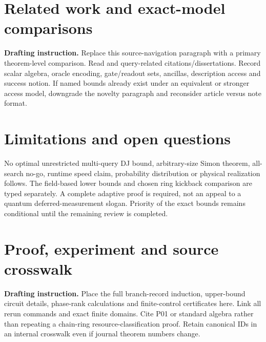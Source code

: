\documentclass[11pt]{article}
\newcommand{\buildnote}[1]{\par\smallskip\noindent\textbf{Drafting instruction.} #1\par\smallskip}
\begin{document}
\section{Related work and exact-model comparisons}
\buildnote{Replace this source-navigation paragraph with a primary theorem-level
comparison. Read \cite{Schumacher2010,Schumacher2012,deBeaudrap2014,James2011,Hanson2011}
and query-related citations/dissertations. Record scalar algebra, oracle
encoding, gate/readout sets, ancillas, description access and success notion.
If named bounds already exist under an equivalent or stronger access model,
downgrade the novelty paragraph and reconsider article versus note format.}

\section{Limitations and open questions}
No optimal unrestricted multi-query DJ bound, arbitrary-size Simon theorem,
all-search no-go, runtime speed claim, probability distribution or physical
realization follows. The field-based lower bounds and chosen ring kickback
comparison are typed separately. A complete adaptive proof is required, not an
appeal to a quantum deferred-measurement slogan. Priority of the exact bounds
remains conditional until the remaining review is completed.

\appendix
\section{Proof, experiment and source crosswalk}
\buildnote{Place the full branch-record induction, upper-bound circuit details,
phase-rank calculations and finite-control certificates here. Link all rerun
commands and exact finite domains. Cite P01 or standard algebra rather than
repeating a chain-ring resource-classification proof. Retain canonical IDs in
an internal crosswalk even if journal theorem numbers change.}

\end{document}
